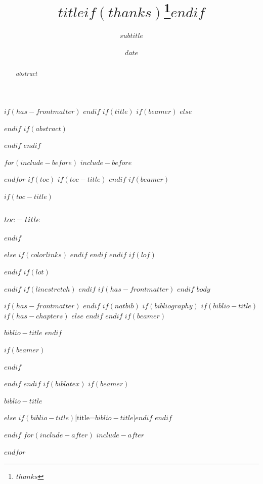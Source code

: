 \documentclass[
$if(fontsize)$
  $fontsize$,
$endif$
$if(papersize)$
  $papersize$paper,
$endif$
$if(beamer)$
  ignorenonframetext,
$if(handout)$
  handout,
$endif$
$if(aspectratio)$
  aspectratio=$aspectratio$,
$endif$
$endif$
$for(classoption)$
  $classoption$$sep$,
$endfor$
]{$documentclass$}
\title{$title$$if(thanks)$\thanks{$thanks$}$endif$}
\subtitle{$subtitle$}
\date{$date$}
\institute{$for(institute)$$institute$$sep$ \and $endfor$}
\newif\ifbibliography
\begin{document}
$if(has-frontmatter)$
\frontmatter
$endif$
$if(title)$
$if(beamer)$
\frame{\titlepage}
$else$
\maketitle
$endif$
$if(abstract)$
\begin{abstract}
$abstract$
\end{abstract}
$endif$
$endif$

$for(include-before)$
$include-before$

$endfor$
$if(toc)$
$if(toc-title)$
\renewcommand*\contentsname{$toc-title$}
$endif$
$if(beamer)$
\begin{frame}[allowframebreaks]
$if(toc-title)$
  \frametitle{$toc-title$}
$endif$
  \tableofcontents[hideallsubsections]
\end{frame}
$else$
{
$if(colorlinks)$
\hypersetup{linkcolor=$if(toccolor)$$toccolor$$else$$endif$}
$endif$
\setcounter{tocdepth}{$toc-depth$}
\tableofcontents
}
$endif$
$endif$
$if(lof)$
\listoffigures
$endif$
$if(lot)$
\listoftables
$endif$
$if(linestretch)$
$endif$
$if(has-frontmatter)$
\mainmatter
$endif$
$body$

$if(has-frontmatter)$
\backmatter
$endif$
$if(natbib)$
$if(bibliography)$
$if(biblio-title)$
$if(has-chapters)$
\renewcommand\bibname{$biblio-title$}
$else$
\renewcommand\refname{$biblio-title$}
$endif$
$endif$
$if(beamer)$
\begin{frame}[allowframebreaks]{$biblio-title$}
  \bibliographytrue
$endif$
  
$if(beamer)$
\end{frame}
$endif$

$endif$
$endif$
$if(biblatex)$
$if(beamer)$
\begin{frame}[allowframebreaks]{$biblio-title$}
  \bibliographytrue
  \printbibliography[heading=none]
\end{frame}
$else$
\printbibliography$if(biblio-title)$[title=$biblio-title$]$endif$
$endif$

$endif$
$for(include-after)$
$include-after$

$endfor$
\end{document}
